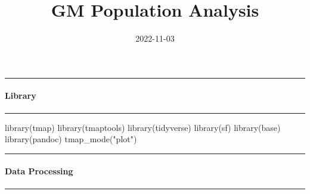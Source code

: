 \documentclass[
]{article}
\title{GM Population Analysis}
\author{}
\date{\vspace{-2.5em}2022-11-03}
\newenvironment{Shaded}{\begin{snugshade}}{\end{snugshade}}
\newcommand{\FunctionTok}[1]{\textcolor[rgb]{0.00,0.00,0.00}{#1}}
\newcommand{\NormalTok}[1]{#1}
\newcommand{\StringTok}[1]{\textcolor[rgb]{0.31,0.60,0.02}{#1}}
\begin{document}
\maketitle

\begin{center}\rule{0.5\linewidth}{0.5pt}\end{center}

\hypertarget{library}{%
\paragraph{Library}\label{library}}

\begin{center}\rule{0.5\linewidth}{0.5pt}\end{center}

\begin{Shaded}
\begin{Highlighting}[]
\FunctionTok{library}\NormalTok{(tmap)}
\FunctionTok{library}\NormalTok{(tmaptools)}
\FunctionTok{library}\NormalTok{(tidyverse)}
\FunctionTok{library}\NormalTok{(sf)}
\FunctionTok{library}\NormalTok{(base)}
\FunctionTok{library}\NormalTok{(pandoc)}
\FunctionTok{tmap\_mode}\NormalTok{(}\StringTok{"plot"}\NormalTok{)}
\end{Highlighting}
\end{Shaded}

\begin{center}\rule{0.5\linewidth}{0.5pt}\end{center}

\hypertarget{data-processing}{%
\paragraph{Data Processing}\label{data-processing}}

\begin{center}\rule{0.5\linewidth}{0.5pt}\end{center}
\end{document}
